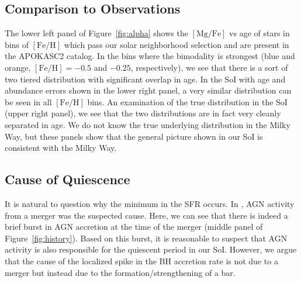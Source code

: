 \documentclass[linenumbers, twocolumn]{aastex631}
\newcommand{\Msun}{\ensuremath{M_{\odot}}}
\newcommand{\Gyr}{\ensuremath{\textrm{Gyr}}}
\newcommand{\FeH}{\ensuremath{[\textrm{Fe}/\textrm{H}]}}
\newcommand{\MgFe}{\ensuremath{[\textrm{Mg}/\textrm{Fe}]}}
\newcommand{\Msunyr}{\ensuremath{\Msun/\textrm{yr}}}
\begin{document}
\subsection{Comparison to Observations}\label{ssec:compare_obs}
The lower left panel of Figure~\ref{fig:alpha} shows the \MgFe{} vs age of stars in bins of \FeH{} which pass our solar neighborhood selection and are present in the APOKASC2 catalog. In the bins where the bimodality is strongest (blue and orange, $\FeH=-0.5$ and $-0.25$, respectively), we see that there is a sort of two tiered distribution with significant overlap in age. In the SoI with age and abundance errors shown in the lower right panel, a very similar distribution can be seen in all \FeH{} bins. An examination of the true distribution in the SoI (upper right panel), we see that the two distributions are in fact very cleanly separated in age. We do not know the true underlying distribution in the Milky Way, but these panels show that the general picture shown in our SoI is consistent with the Milky Way.

\subsection{Cause of Quiescence}\label{ssec:cause_qui}



It is natural to question why the minimum in the SFR occurs. In \citet{2024arXiv240707985B}, AGN activity from a merger was the suspected cause. Here, we can see that there is indeed a brief burst in AGN accretion at the time of the merger (middle panel of Figure~\ref{fig:history}). Based on this burst, it is reasonable to suspect that AGN activity is also responsible for the quiescent period in our SoI. However, we argue that the cause of the localized spike in the BH accretion rate is not due to a merger but instead due to the formation/strengthening of a bar.
\end{document}
